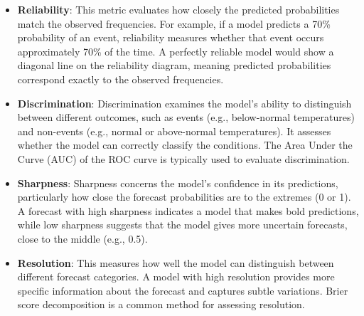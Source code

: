 \begin{itemize}
    \item \textbf{Reliability}: This metric evaluates how closely the predicted probabilities match the observed frequencies. For example, if a model predicts a 70\% probability of an event, reliability measures whether that event occurs approximately 70\% of the time. A perfectly reliable model would show a diagonal line on the reliability diagram, meaning predicted probabilities correspond exactly to the observed frequencies.
    
    \item \textbf{Discrimination}: Discrimination examines the model's ability to distinguish between different outcomes, such as events (e.g., below-normal temperatures) and non-events (e.g., normal or above-normal temperatures). It assesses whether the model can correctly classify the conditions. The Area Under the Curve (AUC) of the ROC curve is typically used to evaluate discrimination.
    
    \item \textbf{Sharpness}: Sharpness concerns the model’s confidence in its predictions, particularly how close the forecast probabilities are to the extremes (0 or 1). A forecast with high sharpness indicates a model that makes bold predictions, while low sharpness suggests that the model gives more uncertain forecasts, close to the middle (e.g., 0.5).
    
    \item \textbf{Resolution}: This measures how well the model can distinguish between different forecast categories. A model with high resolution provides more specific information about the forecast and captures subtle variations. Brier score decomposition is a common method for assessing resolution.
\end{itemize}



%
%


